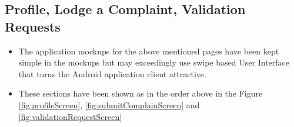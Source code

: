\documentclass[12pt]{article}
\begin{document}
 \subsection{Profile, Lodge a Complaint, Validation Requests}
     \par 
    \begin{itemize} 
    \item The application mockups for the above mentioned pages have been kept simple in the mockups but may exceedingly use swipe based User Interface that turns the Android application client attractive.
    \item These sections have been shown as in the order above in the Figure \ref{fig:profileScreen}, \ref{fig:submitComplainScreen} and \ref{fig:validationRequestScreen}
    \end{itemize}
    
\end{document}
